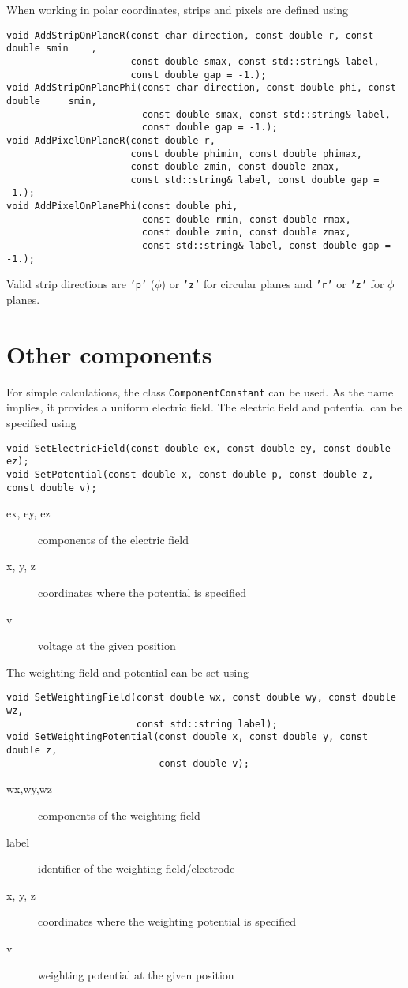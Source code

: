 When working in polar coordinates, strips and pixels are defined using
\begin{lstlisting}
void AddStripOnPlaneR(const char direction, const double r, const double smin    ,
                      const double smax, const std::string& label,
                      const double gap = -1.);
void AddStripOnPlanePhi(const char direction, const double phi, const double     smin,
                        const double smax, const std::string& label,
                        const double gap = -1.);
void AddPixelOnPlaneR(const double r,
                      const double phimin, const double phimax,
                      const double zmin, const double zmax,
                      const std::string& label, const double gap = -1.);
void AddPixelOnPlanePhi(const double phi,
                        const double rmin, const double rmax,
                        const double zmin, const double zmax,
                        const std::string& label, const double gap = -1.);
\end{lstlisting} 
Valid strip directions are \texttt{'p'} ($\phi$) or \texttt{'z'} for 
circular planes and \texttt{'r'} or \texttt{'z'} for $\phi$ planes.

\section{Other components}

For simple calculations, the class \texttt{ComponentConstant} can be used. 
As the name implies, it provides a uniform electric field. 
The electric field and potential can be specified using
\begin{lstlisting}
void SetElectricField(const double ex, const double ey, const double ez);
void SetPotential(const double x, const double p, const double z, const double v);
\end{lstlisting}
\begin{description}
  \item[ex, ey, ez]
  components of the electric field
  \item[x, y, z]
  coordinates where the potential is specified
  \item[v]
  voltage at the given position
\end{description}
The weighting field and potential can be set using
\begin{lstlisting}
void SetWeightingField(const double wx, const double wy, const double wz,
                       const std::string label);
void SetWeightingPotential(const double x, const double y, const double z,
                           const double v);
\end{lstlisting}
\begin{description}
  \item[wx,wy,wz] components of the weighting field
  \item[label] identifier of the weighting field/electrode
  \item[x, y, z] coordinates where the weighting potential is specified
  \item[v] weighting potential at the given position 
\end{description}

